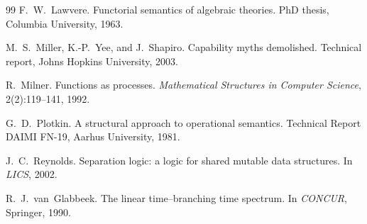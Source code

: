 \begin{thebibliography}{99}
F.~W.~Lawvere.
\newblock Functorial semantics of algebraic theories.
\newblock PhD thesis, Columbia University, 1963.

M.~S.~Miller, K.-P.~Yee, and J.~Shapiro.
\newblock Capability myths demolished.
\newblock Technical report, Johns Hopkins University, 2003.

R.~Milner.
\newblock Functions as processes.
\newblock \emph{Mathematical Structures in Computer Science}, 2(2):119--141, 1992.

G.~D.~Plotkin.
\newblock A structural approach to operational semantics.
\newblock Technical Report DAIMI FN-19, Aarhus University, 1981.

J.~C.~Reynolds.
\newblock Separation logic: a logic for shared mutable data structures.
\newblock In \emph{LICS}, 2002.

R.~J.~van~Glabbeek.
\newblock The linear time--branching time spectrum.
\newblock In \emph{CONCUR}, Springer, 1990.

\end{thebibliography}